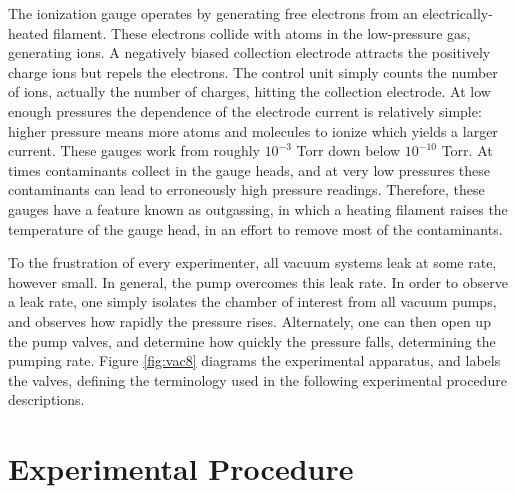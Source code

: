 The ionization gauge operates by generating free electrons from an electrically-heated filament. These electrons collide with atoms in the low-pressure gas, generating ions. A negatively biased collection electrode attracts the positively charge ions but repels the electrons.  The control unit simply counts the number of ions, actually the number of charges, hitting the collection electrode. At low enough pressures the dependence of the electrode current is relatively simple: higher pressure means more atoms and molecules to ionize which yields a larger current. These gauges work from roughly $10^{-3}$ Torr down below $10^{-10}$ Torr. At times contaminants collect in the gauge heads, and at very low pressures these contaminants can lead to erroneously high pressure readings. Therefore, these gauges have a feature known as outgassing, in which a heating filament raises the temperature of the gauge head, in an effort to remove most of the contaminants.

To the frustration of every experimenter, all vacuum systems leak at some rate, however small. In general, the pump overcomes this leak rate. In order to observe a leak rate, one simply isolates the chamber of interest from all vacuum pumps, and observes how rapidly the pressure rises. Alternately, one can then open up the pump valves, and determine how quickly the pressure falls, determining the pumping rate. Figure \ref{fig:vac8} diagrams the experimental apparatus, and labels the valves, defining the terminology used in the following experimental procedure descriptions.

\section{Experimental Procedure}

